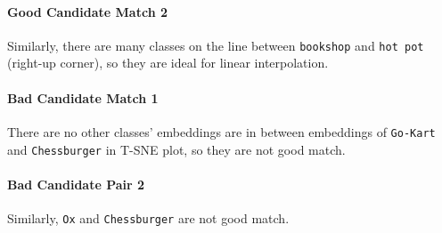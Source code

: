 \documentclass{article}
\begin{document}
	\paragraph{Good Candidate Match 2} Similarly, there are many classes on the line between \texttt{bookshop} and \texttt{hot pot} (right-up corner), so they are ideal for linear interpolation.

	
	\paragraph{Bad Candidate Match 1} There are no other classes' embeddings are in between embeddings of \texttt{Go-Kart} and \texttt{Chessburger} in T-SNE plot, so they are not good match.

	\paragraph{Bad Candidate Pair 2} Similarly, \texttt{Ox} and \texttt{Chessburger} are not good match.
\end{document}

